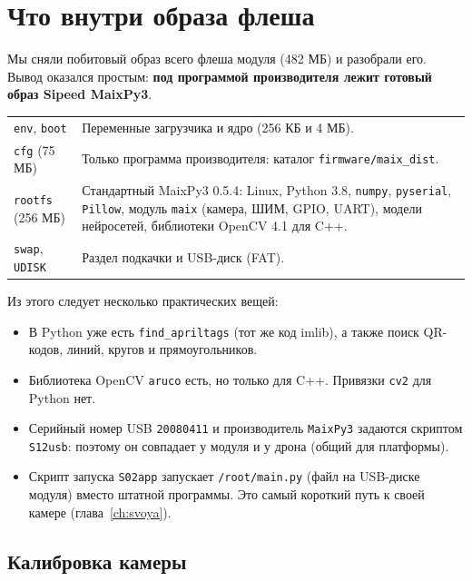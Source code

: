 \section{Что внутри образа флеша}

Мы сняли побитовый образ всего флеша модуля (482 МБ) и разобрали его. Вывод оказался простым: \textbf{под программой производителя лежит готовый образ Sipeed MaixPy3}. \pr{}

\begin{tabularx}{\textwidth}{@{}p{3.1cm} Y@{}}
\toprule
{} &  \\ \midrule
\texttt{env}, \texttt{boot} & Переменные загрузчика и ядро (256 КБ и 4 МБ). \\
\texttt{cfg} (75 МБ) & Только программа производителя: каталог \texttt{firmware/maix\_dist}. \\
\texttt{rootfs} (256 МБ) & Стандартный MaixPy3 0.5.4: Linux, Python 3.8, \texttt{numpy}, \texttt{pyserial}, \texttt{Pillow}, модуль \texttt{maix} (камера, ШИМ, GPIO, UART), модели нейросетей, библиотеки OpenCV 4.1 для C++. \\
\texttt{swap}, \texttt{UDISK} & Раздел подкачки и USB-диск (FAT). \\ \bottomrule
\end{tabularx}

\vspace{4pt}
Из этого следует несколько практических вещей:
\begin{itemize}
  \item В Python уже есть \texttt{find\_apriltags} (тот же код imlib), а также поиск QR-кодов, линий, кругов и прямоугольников.
  \item Библиотека OpenCV \texttt{aruco} есть, но только для C++. Привязки \texttt{cv2} для Python нет.
  \item Серийный номер USB \texttt{20080411} и производитель \texttt{MaixPy3} задаются скриптом \texttt{S12usb}: поэтому он совпадает у модуля и у дрона (общий для платформы).
  \item Скрипт запуска \texttt{S02app} запускает \texttt{/root/main.py} (файл на USB-диске модуля) вместо штатной программы. Это самый короткий путь к своей камере (глава~\ref{ch:svoya}). \vyv{}
\end{itemize}

\subsection*{Калибровка камеры}

